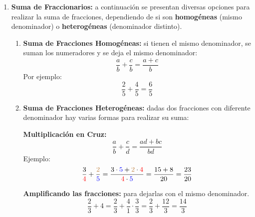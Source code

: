 \begin{enumerate}
\begin{figure}[ht]
\end{figure}
    \item \textbf{Suma de Fraccionarios:} a continuación se presentan diversas opciones para realizar la suma de fracciones, dependiendo de si son \textbf{homogéneas} (mismo denominador) o \textbf{heterogéneas} (denominador distinto).

    \begin{enumerate}
        \item \textbf{Suma de Fracciones Homogéneas:} si tienen el mismo denominador, se suman los numeradores y se deja el mismo denominador:
        \begin{equation}
        \boxed{\frac{a}{b}+\frac{c}{b}=\frac{a+c}{b}}
        \end{equation}
        Por ejemplo: 
        \[ \frac{2}{5}+\frac{4}{5}=\frac{6}{5} \]

        \item \textbf{Suma de Fracciones Heterogéneas:} dadas dos fracciones con diferente denominador hay varias formas para realizar su suma:
        
        \textbf{Multiplicación en Cruz:}
        \begin{equation}
        \boxed{\frac{a}{b}+\frac{c}{d}=\frac{ad+bc}{bd}}
        \end{equation}
        Ejemplo:
        \[ \frac{3}{\textcolor{red}{4}}+\frac{\textcolor{brown}{2}}{\textcolor{blue}{5}}=\frac{3\cdot \textcolor{blue}{5}+\textcolor{brown}{2}\cdot \textcolor{red}{4}}{\textcolor{red}{4}\cdot \textcolor{blue}{5}}=\frac{15+8}{20}=\frac{23}{20} \]

        \textbf{Amplificando las fracciones:} para dejarlas con el mismo denominador.
        \[ \frac{2}{3}+4=\frac{2}{3}+\frac{4}{1}\cdot\frac{3}{3}=\frac{2}{3}+\frac{12}{3}=\frac{14}{3} \]


\end{enumerate}
\end{enumerate}

